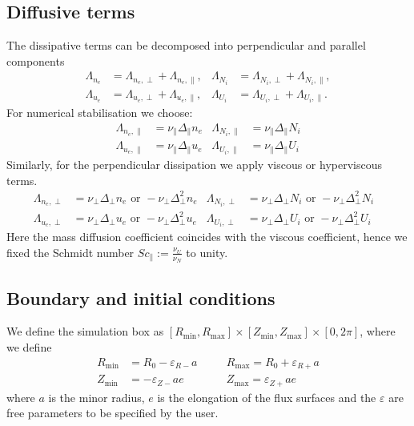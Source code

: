 \subsection{Diffusive terms}\label{sec:dissres}
The dissipative terms can be decomposed into perpendicular and parallel components
\begin{align}
 \Lambda_{n_e} &= \Lambda_{n_e,\perp}+\Lambda_{n_e,\parallel}, &
 \Lambda_{N_i} &= \Lambda_{N_i,\perp}+\Lambda_{N_i,\parallel},\\
 \Lambda_{u_e} &= \Lambda_{u_e,\perp}+\Lambda_{u_e,\parallel},&
 \Lambda_{U_i} &= \Lambda_{U_i,\perp}+\Lambda_{U_i,\parallel}.
\end{align}
For numerical stabilisation we choose:
\begin{align}
\Lambda_{n_e,\parallel} &= \nu_\parallel \Delta_\parallel n_e &
\Lambda_{N_i,\parallel} &= \nu_\parallel \Delta_\parallel N_i \\
\Lambda_{u_e,\parallel} &= \nu_\parallel \Delta_\parallel u_e &
\Lambda_{U_i,\parallel} &= \nu_\parallel \Delta_\parallel U_i 
\end{align}
Similarly, for the perpendicular dissipation we apply viscous or hyperviscous terms.
\begin{align}\label{eq:perpdiffNT}
 \Lambda_{n_e,\perp} &=  \nu_\perp \Delta_\perp n_e \text{ or } -\nu_\perp \Delta_\perp^2 n_e&
 \Lambda_{N_i,\perp} &=  \nu_\perp \Delta_\perp N_i \text{ or } -\nu_\perp \Delta_\perp^2 N_i & \\
 \Lambda_{u_e,\perp} &=  \nu_\perp \Delta_\perp u_e \text{ or } -\nu_\perp \Delta_\perp^2 u_e &
 \Lambda_{U_i,\perp} &=  \nu_\perp \Delta_\perp U_i \text{ or } -\nu_\perp \Delta_\perp^2 U_i
\end{align}
Here the mass diffusion coefficient coincides with the viscous coefficient, hence we fixed the Schmidt number \(\mathit{Sc}_\parallel:= \frac{\nu_U}{\nu_N}\) to unity.

\subsection{Boundary and initial conditions}
We define the simulation box as
$[ R_{\min}, R_{\max}]\times [Z_{\min}, Z_{\max}] \times [0,2\pi]$,
where we define
\begin{align} \label{eq:box}
    R_{\min}&=R_0-\varepsilon_{R-}a\quad
    &&R_{\max}=R_0+\varepsilon_{R+}a\nonumber\\
    Z_{\min}&=-\varepsilon_{Z-}ae\quad
    &&Z_{\max}=\varepsilon_{Z+}ae
\end{align}
where $a$ is the minor radius, $e$ is the elongation of the flux surfaces and
the $\varepsilon$ are free parameters to be specified by the user.

